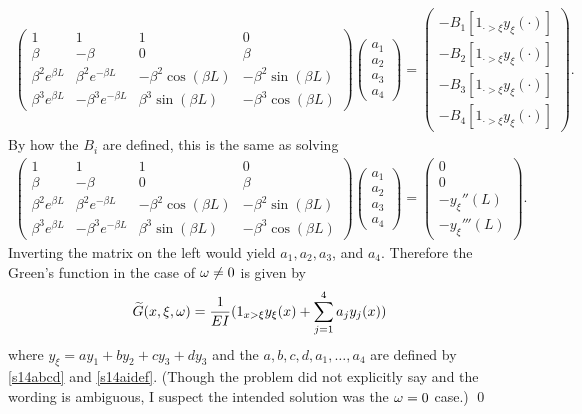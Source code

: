 \begin{align*}
\begin{pmatrix}
1 & 1 & 1 & 0\\
\beta & -\beta & 0 & \beta\\
\beta^{2}e^{\beta L} & \beta^{2}e^{-\beta L} & -\beta^{2}\cos(\beta L) & -\beta^{2}\sin(\beta L)\\
\beta^{3}e^{\beta L} & -\beta^{3}e^{-\beta L} & \beta^{3}\sin(\beta L) & -\beta^{3}\cos(\beta L)
\end{pmatrix}
\begin{pmatrix}
a_1\\ a_2 \\ a_3\\ a_4
\end{pmatrix}
=
\begin{pmatrix}
-B_{1}[1_{\cdot > \xi}y_{\xi}(\cdot)]\\
-B_{2}[1_{\cdot > \xi}y_{\xi}(\cdot)]\\
-B_{3}[1_{\cdot > \xi}y_{\xi}(\cdot)]\\
-B_{4}[1_{\cdot > \xi}y_{\xi}(\cdot)]
\end{pmatrix}.
\end{align*}
By how the $B_{i}$ are defined, this is the same as solving
\begin{align}\label{s14aidef}
\begin{pmatrix}
1 & 1 & 1 & 0\\
\beta & -\beta & 0 & \beta\\
\beta^{2}e^{\beta L} & \beta^{2}e^{-\beta L} & -\beta^{2}\cos(\beta L) & -\beta^{2}\sin(\beta L)\\
\beta^{3}e^{\beta L} & -\beta^{3}e^{-\beta L} & \beta^{3}\sin(\beta L) & -\beta^{3}\cos(\beta L)
\end{pmatrix}
\begin{pmatrix}
a_1\\ a_2 \\ a_3\\ a_4
\end{pmatrix}
=
\begin{pmatrix}
0\\
0\\
-y_{\xi}''(L)\\
-y_{\xi}'''(L)
\end{pmatrix}.
\end{align}
Inverting the matrix on the left would yield $a_{1}, a_{2}, a_{3}$, and $a_{4}$.
Therefore the Green's function in the case of $\omega \neq 0$ is given by
$$\widetilde{G}(x, \xi, \omega) = \frac{1}{EI}(1_{x > \xi}y_{\xi}(x) + \sum_{j = 1}^{4}a_{j}y_{j}(x))$$
where $y_{\xi} = ay_{1} + by_{2} + cy_{3} + dy_{3}$ and the $a, b, c, d, a_{1}, \ldots, a_{4}$ are defined by \eqref{s14abcd} and \eqref{s14aidef}.
(Though the problem did not explicitly say and the wording is ambiguous, I suspect the intended solution was the $\omega = 0$ case.)
\hfill\qed

